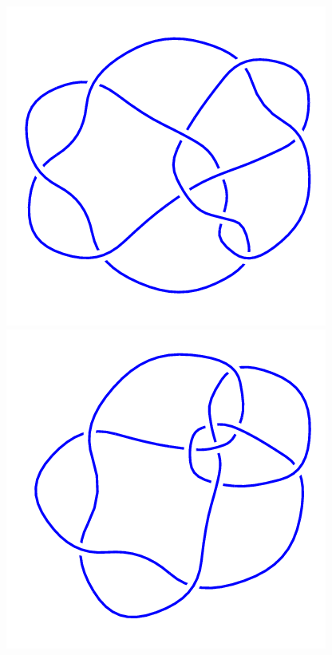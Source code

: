 \begin{figure}[H]
	\begin{minipage}[b]{.18\linewidth}
		\centering
		\includegraphics[width=\linewidth]{../data/10_162.png}
	\end{minipage}
	\begin{minipage}[b]{.18\linewidth}
		\centering
		\includegraphics[width=\linewidth]{../data/10_163.png}

\end{minipage}
\end{figure}
